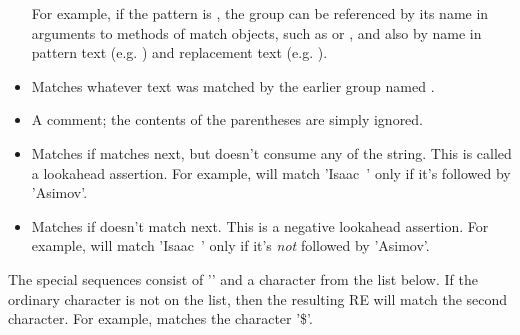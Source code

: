\begin{itemize}
For example, if the pattern is
, the group can be referenced by its
name in arguments to methods of match objects, such as 
or , and also by name in pattern text
(e.g. ) and replacement text (e.g. ).
%
\item[\code{(?P=\var{name})}] Matches whatever text was matched by the
earlier group named .
%
\item[\code{(?\#...)}] A comment; the contents of the parentheses are
simply ignored.
%
\item[\code{(?=...)}] Matches if  matches next, but doesn't
consume any of the string.  This is called a lookahead assertion.  For
example,  will match 'Isaac~' only if it's
followed by 'Asimov'.
%
\item[\code{(?!...)}] Matches if  doesn't match next.  This
is a negative lookahead assertion.  For example,
 will match 'Isaac~' only if it's \emph{not}
followed by 'Asimov'.

\end{itemize}

The special sequences consist of '\code{\e}' and a character from the
list below.  If the ordinary character is not on the list, then the
resulting RE will match the second character.  For example,
\code{\e\$} matches the character '\$'.  


